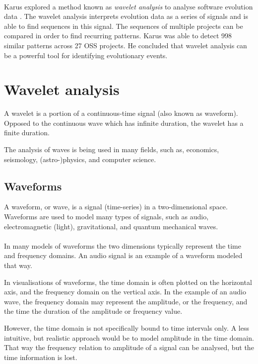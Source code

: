 \paragraph{}
Karus explored a method known as \emph{wavelet analysis }\rm to analyse software
evolution data \cite{karus2013}. The wavelet analysis interprets evolution data
as a series of signals and is able to find sequences in this signal. The
sequences of multiple projects can be compared in order to find recurring
patterns. Karus was able to detect 998 similar patterns across 27 OSS projects.
He concluded that wavelet analysis can be a powerful tool for identifying
evolutionary events.





\section{Wavelet analysis}
A wavelet is a portion of a continuous-time signal (also known as waveform).
Opposed to the continuous wave which has infinite duration, the wavelet has a
finite duration.

The analysis of waves is being used in many fields, such as, economics,
seismology, (astro-)physics, and computer science.

\subsection{Waveforms}
A waveform, or wave, is a signal (time-series) in a two-dimensional space.
Waveforms are used to model many types of signals, such as audio,
electromagnetic (light), gravitational, and quantum mechanical waves.

\paragraph{}
In many models of waveforms the two dimensions typically represent the time and
frequency domains. An audio signal is an example of a waveform modeled that way.

In visualisations of waveforms, the time domain is often plotted on the
horizontal axis, and the frequency domain on the vertical axis. In the example
of an audio wave, the frequency domain may represent the amplitude, or the
frequency, and the time the duration of the amplitude or frequency value.

However, the time domain is not specifically bound to time intervals only. A
less intuitive, but realistic approach would be to model amplitude in the time
domain. That way the frequency relation to amplitude of a signal can be
analysed, but the time information is lost.


